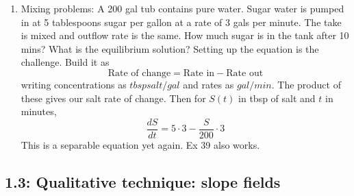 \documentclass{article}
\begin{document}
\begin{enumerate}
\item Mixing problems: A 200 gal tub contains pure water. Sugar water is pumped in at 5 tablespoons sugar per gallon at a rate of 3 gals per minute. The take is mixed and outflow rate is the same. How much sugar is in the tank after 10 mins? What is the equilibrium solution? Setting up the equation is the challenge. Build it as 
\[
\text{Rate of change} = \text{Rate in} - \text{Rate out}
\]
writing concentrations as $tbsp salt/gal$ and rates as $gal/min$. The product of these gives our salt rate of change. Then for $S(t)$ in tbsp of salt and $t$ in minutes,
\[
\frac{dS}{dt} = 5 \cdot 3 - \frac{S}{200} \cdot 3
\]
This is a separable equation yet again. Ex 39 also works.

\end{enumerate}

\subsection{1.3: Qualitative technique: slope fields}
\end{document}
